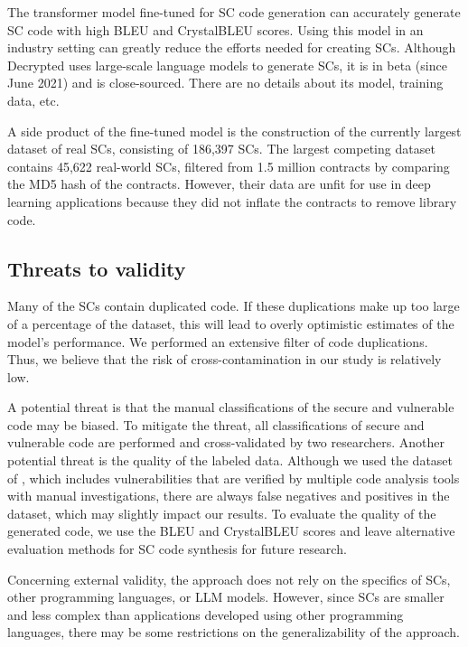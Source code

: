 \documentclass[12pt]{book}
\begin{document}
The transformer model fine-tuned for SC code generation can accurately generate SC code with high BLEU and CrystalBLEU scores. Using this model in an industry setting can greatly reduce the efforts needed for creating SCs. Although Decrypted \cite{Decrypted} uses large-scale language models to generate SCs, it is in beta (since June 2021) and is close-sourced. There are no details about its model, training data, etc. 

A side product of the fine-tuned model is the construction of the currently largest dataset of real SCs, consisting of 186,397 SCs. The largest competing dataset \cite{ren2021empirical} contains 45,622 real-world SCs, filtered from 1.5 million contracts by comparing the MD5 hash of the contracts. However, their data are unfit for use in deep learning applications because they did not inflate the contracts to remove library code.

\subsection{Threats to validity}
\label{sec:rq1-threats-to-validity}

Many of the SCs contain duplicated code. If these duplications make up too large of a percentage of the dataset, this will lead to overly optimistic estimates of the model's performance. We performed an extensive filter of code duplications. Thus, we believe that the risk of cross-contamination in our study is relatively low.

A potential threat is that the manual classifications of the secure and vulnerable code may be biased. To mitigate the threat, all classifications of secure and vulnerable code are performed and cross-validated by two researchers. Another potential threat is the quality of the labeled data. Although we used the dataset of \cite{Hu2023}, which includes vulnerabilities that are verified by multiple code analysis tools with manual investigations, there are always false negatives and positives in the dataset, which may slightly impact our results. To evaluate the quality of the generated code, we use the BLEU and CrystalBLEU scores and leave alternative evaluation methods for SC code synthesis for future research.  

Concerning external validity, the approach does not rely on the specifics of SCs, other programming languages, or LLM models. However, since SCs are smaller and less complex than applications developed using other programming languages, there may be some restrictions on the generalizability of the approach.
\end{document}
